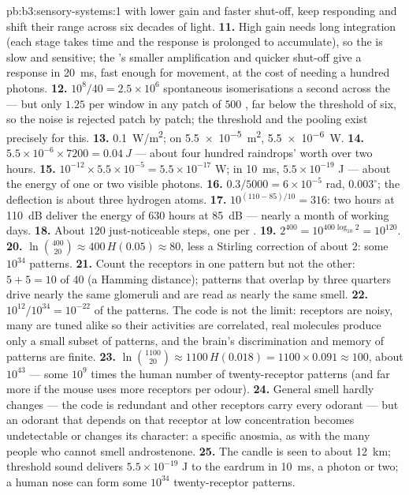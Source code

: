\begin{solution}{pb:b3:sensory-systems:1}
with lower gain and faster shut-off, keep responding and shift their
range across six decades of light.
\textbf{11.} High gain needs long integration (each stage takes time and
the response is prolonged to accumulate), so the  is slow and
sensitive; the 's smaller amplification and quicker shut-off give a
response in \qty{20}{ms}, fast enough for movement, at the cost of
needing a hundred photons.
\textbf{12.} $10^{8}/40 = 2.5\times 10^{6}$ spontaneous isomerisations a
second across the  --- but only $1.25$ per window in any patch of
$500$ , far below the threshold of six, so the noise is rejected
patch by patch; the threshold and the pooling exist precisely for this.
\textbf{13.} \qty{0.1}{W/m^2}; on \qty{5.5e-5}{m^2}, \qty{5.5e-6}{W}.
\textbf{14.} $5.5\times 10^{-6}\times 7200 = \qty{0.04}{J}$ --- about four
hundred raindrops' worth over two hours.
\textbf{15.} $10^{-12}\times 5.5\times 10^{-5} = 5.5\times 10^{-17}$ W;
in \qty{10}{ms}, $5.5\times 10^{-19}$ J --- about the energy of one or
two visible photons.
\textbf{16.} $0.3/5000 = 6\times 10^{-5}$ rad, $0.003^{\circ}$; the
deflection is about three hydrogen atoms.
\textbf{17.} $10^{(110 - 85)/10} = 316$: two hours at \qty{110}{dB}
deliver the energy of $630$ hours at \qty{85}{dB} --- nearly a month of
working days.
\textbf{18.} About $120$ just-noticeable steps, one per .
\textbf{19.} $2^{400} = 10^{400\log_{10}2} = 10^{120}$.
\textbf{20.} $\ln\binom{400}{20} \approx 400\,H(0.05) \approx 80$, less a
Stirling correction of about $2$: some $10^{34}$ patterns.
\textbf{21.} Count the receptors in one pattern but not the other: $5 +
5 = 10$ of $40$ (a Hamming distance); patterns that overlap by three
quarters drive nearly the same glomeruli and are read as nearly the
same smell.
\textbf{22.} $10^{12}/10^{34} = 10^{-22}$ of the patterns. The code is not
the limit: receptors are noisy, many are tuned alike so their
activities are correlated, real molecules produce only a small subset of
patterns, and the brain's discrimination and memory of patterns are
finite.
\textbf{23.} $\ln\binom{1100}{20} \approx 1100\,H(0.018) = 1100\times
0.091 \approx 100$, about $10^{43}$ --- some $10^{9}$ times the human
number of twenty-receptor patterns (and far more if the mouse uses
more receptors per odour).
\textbf{24.} General smell hardly changes --- the code is redundant and
other receptors carry every odorant --- but an odorant that depends on
that receptor at low concentration becomes undetectable or changes its
character: a specific anosmia, as with the many people who cannot
smell androstenone.
\textbf{25.} The candle is seen to about \qty{12}{km}; threshold sound
delivers $5.5\times 10^{-19}$ J to the eardrum in \qty{10}{ms}, a photon
or two; a human nose can form some $10^{34}$ twenty-receptor patterns.
\end{solution}
